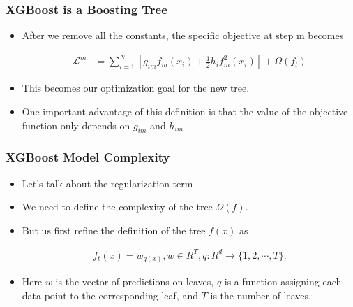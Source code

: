 \documentclass[
  shownotes,
  xcolor={svgnames},
  hyperref={colorlinks,citecolor=DarkBlue,linkcolor=DarkRed,urlcolor=DarkBlue}
  , aspectratio=169]{beamer}
\begin{document}
\begin{frame}[fragile]
\frametitle{XGBoost is a Boosting Tree }

\begin{itemize}


\item After we remove all the constants, the specific objective at step m becomes
\medskip

\begin{align}
\mathcal{L}^m &= \sum_{i=1}^N \left[ g_{im} f_m(x_i) + \frac{1}{2}h_i f^2_m(x_i) \right] +  \Omega(f_t)
\end{align}
\medskip
\item This becomes our optimization goal for the new tree. 
\medskip
\item One important advantage of this definition is that the value of the objective function only depends on $g_{im}$ and $h_{im}$ 


\end{itemize}



 \end{frame}

\begin{frame}[fragile]
\frametitle{XGBoost Model Complexity}

\begin{itemize}
\item Let's talk about the  regularization term 
\item We need to define the complexity of the tree $\Omega(f)$.
\item But us first refine the definition of the tree $f(x)$ as

 
\begin{align}
f_t(x) = w_{q(x)}, w \in R^T, q:R^d\rightarrow \{1,2,\cdots,T\} .
\end{align}


\item Here $w$ is the vector of predictions on leaves, $q$ is a function assigning each data point to the corresponding leaf, and $T$ is the number of leaves. 

\end{itemize}

 \end{frame}
\end{document}
